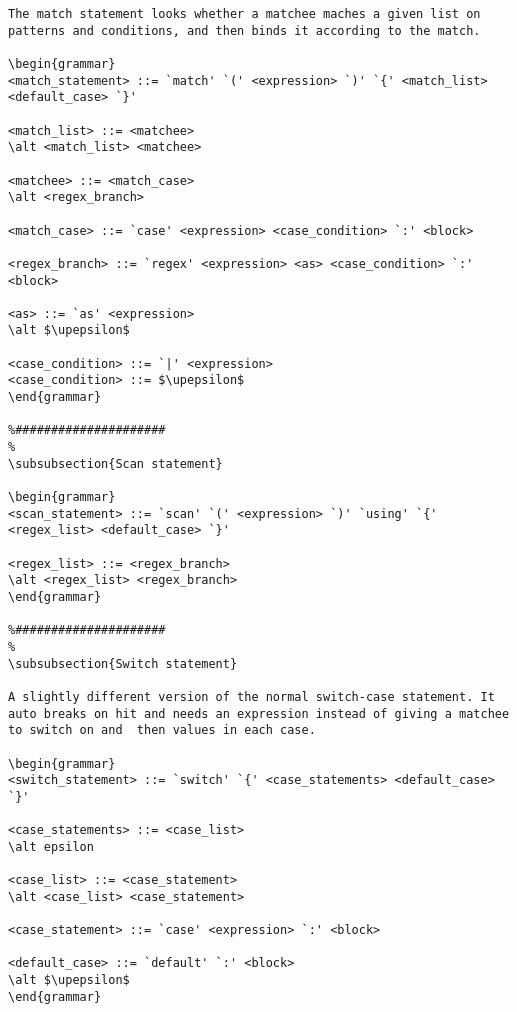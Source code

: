 \begin{verbatim}
The match statement looks whether a matchee maches a given list on patterns and conditions, and then binds it according to the match.

\begin{grammar}
<match_statement> ::= `match' `(' <expression> `)' `{' <match_list> <default_case> `}'

<match_list> ::= <matchee>
\alt <match_list> <matchee>

<matchee> ::= <match_case>
\alt <regex_branch>

<match_case> ::= `case' <expression> <case_condition> `:' <block>

<regex_branch> ::= `regex' <expression> <as> <case_condition> `:' <block>

<as> ::= `as' <expression>
\alt $\upepsilon$

<case_condition> ::= `|' <expression>
<case_condition> ::= $\upepsilon$
\end{grammar}

%#####################
%
\subsubsection{Scan statement}

\begin{grammar}
<scan_statement> ::= `scan' `(' <expression> `)' `using' `{' <regex_list> <default_case> `}'

<regex_list> ::= <regex_branch>
\alt <regex_list> <regex_branch>
\end{grammar}

%#####################
%
\subsubsection{Switch statement}

A slightly different version of the normal switch-case statement. It auto breaks on hit and needs an expression instead of giving a matchee to switch on and  then values in each case.

\begin{grammar}
<switch_statement> ::= `switch' `{' <case_statements> <default_case> `}'

<case_statements> ::= <case_list>
\alt epsilon

<case_list> ::= <case_statement>
\alt <case_list> <case_statement>

<case_statement> ::= `case' <expression> `:' <block>

<default_case> ::= `default' `:' <block>
\alt $\upepsilon$
\end{grammar}


\end{verbatim}
